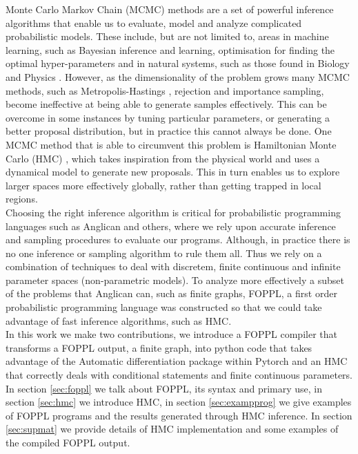 \documentclass[twoside]{article}
\begin{document}
Monte Carlo Markov Chain (MCMC) methods are a set of powerful inference algorithms \citep{berg2008markov} that enable us to evaluate, model and analyze complicated probabilistic models. These include, but are not limited to, areas in machine learning, such as Bayesian inference and learning, optimisation for finding the optimal hyper-parameters \citep{andrieu2003introduction} and in natural systems, such as those found in Biology \citep{sorensen2007likelihood} and Physics \citep{duane1987hybrid}. 
However, as the dimensionality of the problem grows many MCMC methods, such as Metropolis-Hastings \citep{hastings1970monte}, rejection and importance sampling,  become ineffective at being able to generate samples effectively. This can be overcome in some instances by tuning particular parameters, or generating a better proposal distribution, but in practice this cannot always be done. One MCMC method that is able to circumvent this problem is Hamiltonian Monte Carlo (HMC) \citep{neal2011mcmc}\citep{duane1987hybrid}, which takes inspiration from the physical world and uses a dynamical model to generate new proposals. This in turn enables us to explore larger spaces more effectively globally, rather than getting trapped in local regions. \\
Choosing the right inference algorithm is critical for probabilistic programming languages \citep{tolpin2015probabilistic} such as Anglican \citep{wood2014new} and others, where we rely upon accurate inference and sampling procedures to evaluate our programs. Although, in practice there is no one inference or sampling algorithm to rule them all. Thus we rely on a combination of techniques to deal with discretem, finite continuous and infinite parameter spaces (non-parametric models). To analyze more effectively a subset of the problems that Anglican can, such as finite graphs, FOPPL, a first order probabilistic programming language was constructed so that we could take advantage of fast inference algorithms, such as HMC.\\
In this work we make two contributions, we introduce a FOPPL compiler that transforms a FOPPL output, a finite graph, into python code that takes advantage of the Automatic differentiation package within Pytorch \citep{pytorch} and an HMC that correctly deals with conditional statements and finite continuous parameters.
In section \ref{sec:foppl} we talk about FOPPL, its syntax and primary use, in section \ref{sec:hmc} we introduce HMC, in section \ref{sec:exampprog} we give examples of FOPPL programs and the results generated through HMC inference. In section \ref{sec:supmat} we provide details of HMC implementation and some examples of the compiled FOPPL output. 
\end{document}
